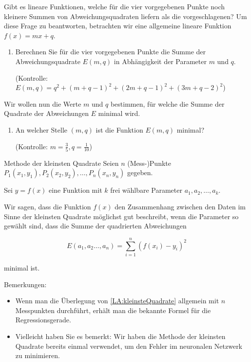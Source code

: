 \begin{LA}
\vspace*{3cm}
Gibt es lineare Funktionen, welche für die vier vorgegebenen Punkte noch kleinere Summen von Abweichungsquadraten liefern als die vorgeschlagenen? Um diese Frage zu beantworten, betrachten wir eine allgemeine lineare Funktion \( f(x) = mx + q \).  

\begin{enumerate}[resume]
    \item Berechnen Sie für die vier vorgegebenen Punkte die Summe der Abweichungsquadrate \( E(m, q) \) in Abhängigkeit der Parameter \( m \) und \( q \).  
    
    (Kontrolle: \( E(m, q) = q^2 + (m + q - 1)^2 + (2m + q - 1)^2 + (3m + q - 2)^2 \))
    
\end{enumerate}
\vspace*{5cm}
Wir wollen nun die Werte \( m \) und \( q \) bestimmen, für welche die Summe der Quadrate der Abweichungen \( E \) minimal wird.  


\begin{enumerate}[resume]
    \item An welcher Stelle \( (m, q) \) ist die Funktion \( E(m, q) \) minimal?  
    
    (Kontrolle: \( m = \frac{3}{5}, q = \frac{1}{10} \))
\end{enumerate}
\end{LA}

\clearpage


\begin{definition}
{Methode der kleinsten Quadrate}{}
Seien \( n \) (Mess-)Punkte \( P_1 (x_1, y_1), P_2 (x_2, y_2), \dots, P_n (x_n, y_n) \) gegeben.

Sei $y=f(x)$ eine Funktion mit $k$ frei wählbare Parameter $a_1, a_2, \dots, a_k$.

Wir sagen, dass die Funktion $f(x)$ den Zusammenhang zwischen den Daten im Sinne der kleinsten Quadrate möglichst gut beschreibt, wenn die Parameter so gewählt sind, dass die Summe der quadrierten Abweichungen 

$$E(a_1, a_2 \dots, a_n) = \sum_{i=1}^n (f(x_i)- y_i)^2 $$

minimal ist.

\end{definition}

Bemerkungen:
\begin{itemize}
    \item Wenn man die Überlegung von \cref*{LA:kleinsteQuadrate} allgemein mit $n$ Messpunkten durchführt, erhält man die bekannte Formel für die Regressionsgerade.
    \item Vielleicht haben Sie es bemerkt: Wir haben die Methode der kleinsten Quadrate bereits einmal verwendet, um den Fehler im neuronalen Netzwerk zu minimieren.
\end{itemize}

